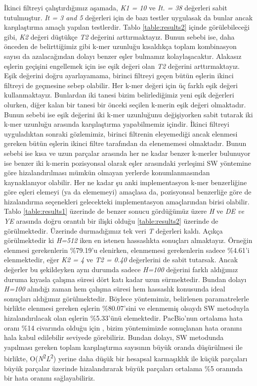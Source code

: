 İkinci filtreyi çalıştırdığımız aşamada, \textit{K1 = 10} ve \textit{It. = 38} değerleri sabit tutulmuştur. \textit{It = 3 and 5} değerleri için de bazı testler uygulasak da bunlar ancak karşılaştırma amaçlı yapılan testlerdir. Tablo \ref{table:results2} içinde görülebileceği gibi, \textit{K2} değeri düştükçe \textit{T2} değerini arttırmaktayız. Bunun sebebi ise, daha önceden de belirttiğimiz gibi k-mer uzunluğu kısaldıkça toplam kombinasyon sayısı da azalacağından dolayı benzer eşler bulmamız kolaylaşacaktır. Alakasız eşlerin geçişini engellemek için ise eşik değeri olan \textit{T2} değerini arttırmaktayız. Eşik değerini doğru ayarlayamama, birinci filtreyi geçen bütün eşlerin ikinci filtreyi de geçmesine sebep olabilir. Her k-mer değeri için üç farklı eşik değeri kullanmaktayız. Bunlardan iki tanesi bizim belirlediğimiz yeni eşik değerleri olurken, diğer kalan bir tanesi bir önceki seçilen k-merin eşik değeri olmaktadır. Bunun sebebi ise eşik değerini iki k-mer uzunluğunu değişiyorken sabit tutarak iki k-mer uzunluğu arasında karşılaştırma yapabilmemiz içindir. İkinci filtreyi uyguladıktan sonraki gözlemimiz, birinci filtrenin eleyemediği ancak elenmesi gereken bütün eşlerin ikinci filtre tarafından da elenememesi olmaktadır. Bunun sebebi ise kısa ve uzun parçalar arasında her ne kadar benzer k-merler bulunuyor ise benzer iki k-merin pozisyonsal olarak eşler arasındaki yerleşimi SW yöntemine göre hizalandırılması mümkün olmayan yerlerde konumlanmasından kaynaklanıyor olabilir. Her ne kadar şu anki implementasyon k-mer benzerliğine göre eşleri elemeyi (ya da elememeyi) amaçlasa da, pozisyonsal benzerliğe göre de hizalandırma seçenekleri gelecekteki implementasyon amaçlarından birisi olabilir. Tablo \ref{table:results1} üzerinde de benzer sonucu gördüğümüz üzere \textit{H} ve \textit{DE ve YE} arasında doğru orantılı bir ilişki olduğu \ref{table:results2} üzerinde de görülmektedir. Üzerinde durmadığımız tek veri \textit{T} değerleri kaldı. Açıkça görülmektedir ki \textit{H=512} iken en istenen hassaslıkta sonuçları almaktayız. Örneğin elenmesi gerekenlerin \%79.19'u elenirken, elenmemesi gerekenlerin sadece \%4.61'i elenmektedir, eğer \textit{K2 = 4} ve \textit{T2 = 0.40} değerlerini de sabit tutarsak. Ancak değerler bu şekildeyken aynı durumda sadece \textit{H=100} değerini farklı aldığımız duruma kıyasla çalışma süresi dört katı kadar uzun sürmektedir. Bundan dolayı \textit{H=100} alındığı zaman hem çalışma süresi hem hassaslık konusunda ideal sonuçları aldığımız görülmektedir. Böylece yöntemimiz, belirlenen paramatrelerle birlikte elenmesi gereken eşlerin \%80.07'sini ve elenmemiş olsaydı SW metoduyla hizalandırılacak olan eşlerin \%5.33'ünü elemektedir. PacBio'nun ortalama hata oranı \%14 civarında olduğu için \cite{pacbioerr}, bizim yöntemimizde sonuçlanan hata oranını hala kabul edilebilir seviyede görebiliriz. Bundan dolayı, SW metodunda yapılması gereken toplam karşılaştırma sayısının büyük oranda düşürülmesi ile birlikte, O(\textit{N}\textsuperscript{2}\textit{L}\textsuperscript{2}) yerine daha düşük bir hesapsal karmaşıklık ile küçük parçaları büyük parçalar üzerinde hizalandırarak büyük parçaları ortalama \%5 oranında bir hata oranını sağlayabiliriz.
